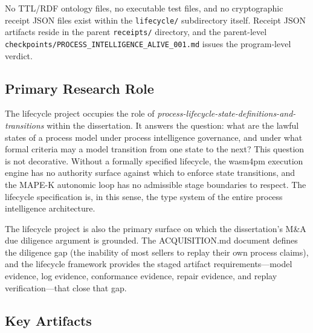 No TTL/RDF ontology files, no executable test files, and no cryptographic receipt JSON
files exist within the \texttt{lifecycle/} subdirectory itself. Receipt JSON artifacts
reside in the parent \texttt{receipts/} directory, and the parent-level
\texttt{checkpoints/PROCESS\_INTELLIGENCE\_ALIVE\_001.md} issues the program-level verdict.

\subsection{Primary Research Role}
\label{sec:lifecycle-identity-role}

The lifecycle project occupies the role of \emph{process-lifecycle-state-definitions-and-transitions}
within the dissertation. It answers the question: what are the lawful states of a process
model under process intelligence governance, and under what formal criteria may a model
transition from one state to the next? This question is not decorative. Without a formally
specified lifecycle, the wasm4pm execution engine has no authority surface against which
to enforce state transitions, and the MAPE-K autonomic loop has no admissible stage
boundaries to respect. The lifecycle specification is, in this sense, the type system of
the entire process intelligence architecture.

The lifecycle project is also the primary surface on which the dissertation's M\&A due
diligence argument is grounded. The ACQUISITION.md document defines the diligence gap
(the inability of most sellers to replay their own process claims), and the lifecycle
framework provides the staged artifact requirements---model evidence, log evidence,
conformance evidence, repair evidence, and replay verification---that close that gap.

\subsection{Key Artifacts}
\label{sec:lifecycle-identity-artifacts}

